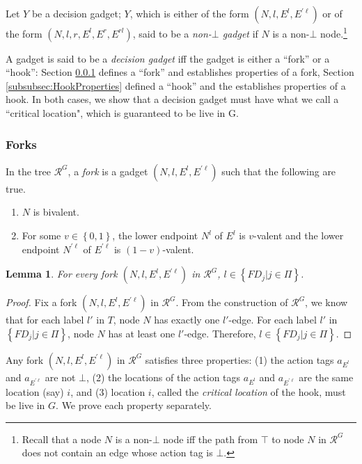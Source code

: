 \documentclass[11pt]{article}
\numberwithin{theorem}{section}
\newtheorem{lemma}[theorem]{Lemma}
\newcommand{\set}[1]{\left\{#1\right\}}
\begin{document}
Let $Y$ be a decision gadget; $Y$, which is either of the form $(N,l,E^l,E^{\prime \ell})$ or of the form $(N,l,r,E^l,E^r,E^{rl})$, said to be a \emph{non-$\bot$ gadget} if $N$ is a non-$\bot$ node.\footnote{Recall that a node $N$ is a non-$\bot$ node iff the path from $\top$ to node $N$ in $\mathcal{R}^G$ does not contain an edge whose action tag is $\bot$.}

 A gadget is said to be a \emph{decision gadget} iff the gadget is either a ``fork'' or a ``hook'': Section \ref{subsubsec:ForkProperties} defines a ``fork'' and establishes properties of a fork, Section \ref{subsubsec:HookProperties} defined a ``hook'' and the establishes properties of a hook.   In both cases, we show that a decision gadget must have what we call a ``critical location", which is guaranteed to be live in G.










\subsubsection{Forks}
\label{subsubsec:ForkProperties}

In the tree $\mathcal{R}^{G}$, a \emph{fork} is a gadget $(N,l,E^l,E^{\prime \ell})$ such that the following are true.
\begin{enumerate}
 \item $N$ is bivalent.
 \item For some $v \in \set{0,1}$, the lower endpoint $N^l$ of $E^l$ is $v$-valent and the lower endpoint $N^{\prime \ell}$ of $E^{\prime \ell}$ is $(1-v)$-valent.
\end{enumerate}
 
 \begin{lemma}\label{lem:forkTaskFD}
For every fork $(N,l,E^l,E^{\prime \ell})$ in $\mathcal{R}^G$, $l \in \set{FD_j|j\in \Pi}$.
\end{lemma}
\begin{proof}
Fix a fork $(N,l,E^l,E^{\prime \ell})$ in $\mathcal{R}^G$. 
From the construction of $\mathcal{R}^G$, we know that for each label $l'$ in $T$, node $N$ has exactly one $l'$-edge. For each label $l'$ in $\set{FD_j|j\in \Pi}$, node $N$ has at least one $l'$-edge. Therefore, $l \in \set{FD_j|j\in \Pi}$.
\end{proof}


Any fork $(N,l,E^l,E^{\prime \ell})$ in $\mathcal{R}^G$ satisfies three properties: (1) the action tags $a_{E^l}$ and $a_{E^{\prime \ell}}$ are not $\bot$, (2) the locations of the action tags $a_{E^l}$ and $a_{E^{\prime \ell}}$ are the same location (say) $i$, and (3) location $i$, called the \emph{critical location} of the hook, must be live in $G$. We prove each property separately.
\end{document}
